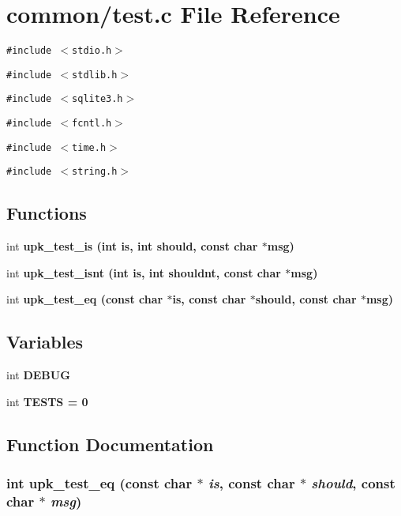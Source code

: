\section{common/test.c File Reference}
\label{common_2test_8c}
{\tt \#include $<$stdio.h$>$}\par
{\tt \#include $<$stdlib.h$>$}\par
{\tt \#include $<$sqlite3.h$>$}\par
{\tt \#include $<$fcntl.h$>$}\par
{\tt \#include $<$time.h$>$}\par
{\tt \#include $<$string.h$>$}\par
\subsection*{Functions}
\begin{CompactItemize}
\item 
int \bf{upk\_\-test\_\-is} (int is, int should, const char $\ast$msg)
\item 
int \bf{upk\_\-test\_\-isnt} (int is, int shouldnt, const char $\ast$msg)
\item 
int \bf{upk\_\-test\_\-eq} (const char $\ast$is, const char $\ast$should, const char $\ast$msg)
\end{CompactItemize}
\subsection*{Variables}
\begin{CompactItemize}
\item 
int \bf{DEBUG}
\item 
int \bf{TESTS} = 0
\end{CompactItemize}


\subsection{Function Documentation}
\subsubsection{\setlength{\rightskip}{0pt plus 5cm}int upk\_\-test\_\-eq (const char $\ast$ {\em is}, const char $\ast$ {\em should}, const char $\ast$ {\em msg})}\label{common_2test_8c_82c4f602d65902bf8ababa0d674bd7c7}


